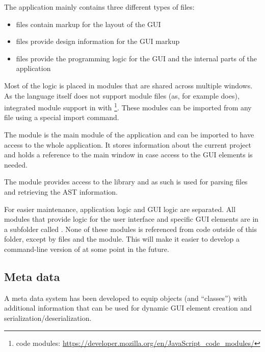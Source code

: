 The application mainly contains three different types of files:

\begin{itemize}\addtolength{\itemsep}{-0.5\baselineskip}
\item {} files contain markup for the layout of the GUI
\item {} files provide design information for the GUI markup
\item {} files provide the programming logic for the GUI and the internal parts of the application
\end{itemize}

Most of the  logic is placed in modules that are shared across multiple windows. As the  language itself does not support module files (as, for example  does),  integrated module support in  with \footnote{ code modules: \url{https://developer.mozilla.org/en/JavaScript_code_modules/}}. These modules can be imported from any  file using a special import command.

The  module is the main module of the application and can be imported to have access to the whole application. It stores information about the current project and holds a reference to the main window in case access to the GUI elements is needed.

The  module provides access to the  library and as such is used for parsing  files and retrieving the AST information.

For easier maintenance, application logic and GUI logic are separated. All modules that provide logic for the user interface and specific GUI elements are in a subfolder called . None of these modules is referenced from code outside of this folder, except by  files and the  module. This will make it easier to develop a command-line version of  at some point in the future.

\subsection{Meta data}
\label{sec:MetaData}

A meta data system has been developed to equip  objects (and ``classes'') with additional information that can be used for dynamic GUI element creation and serialization/deserialization.

